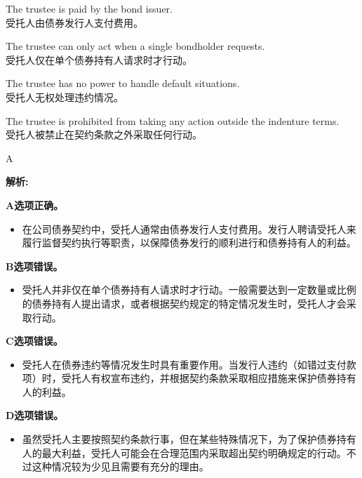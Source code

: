 \documentclass{article}
\newenvironment{explanation}
{\textbf{解析:}\par}
{\par}
\begin{document}
    \begin{choices}
        \item The trustee is paid by the bond issuer.\\
        受托人由债券发行人支付费用。
        \item The trustee can only act when a single bondholder requests.\\
        受托人仅在单个债券持有人请求时才行动。
        \item The trustee has no power to handle default situations.\\
        受托人无权处理违约情况。
        \item The trustee is prohibited from taking any action outside the indenture terms.\\
        受托人被禁止在契约条款之外采取任何行动。
    \end{choices}
    
    \begin{correctanswer}
        A
    \end{correctanswer}
    
    \begin{explanation}
    \textbf{A选项正确。}
    \begin{itemize}
        \item 在公司债券契约中，受托人通常由债券发行人支付费用。发行人聘请受托人来履行监督契约执行等职责，以保障债券发行的顺利进行和债券持有人的利益。
    \end{itemize}
    \textbf{B选项错误。}
    \begin{itemize}
        \item 受托人并非仅在单个债券持有人请求时才行动。一般需要达到一定数量或比例的债券持有人提出请求，或者根据契约规定的特定情况发生时，受托人才会采取行动。
    \end{itemize}
    \textbf{C选项错误。}
    \begin{itemize}
        \item 受托人在债券违约等情况发生时具有重要作用。当发行人违约（如错过支付款项）时，受托人有权宣布违约，并根据契约条款采取相应措施来保护债券持有人的利益。
    \end{itemize}
    \textbf{D选项错误。}
    \begin{itemize}
        \item 虽然受托人主要按照契约条款行事，但在某些特殊情况下，为了保护债券持有人的最大利益，受托人可能会在合理范围内采取超出契约明确规定的行动。不过这种情况较为少见且需要有充分的理由。
    \end{itemize}
    \end{explanation}
    
\end{document}
